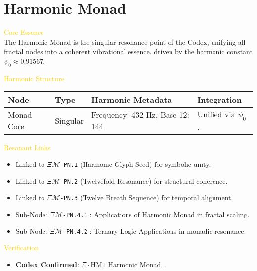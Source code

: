 
\section{Harmonic Monad}
\label{sec:codex_harmonic_monad}


\textcolor{gold}{ Core Essence } \\
The Harmonic Monad is the singular resonance point of the Codex, unifying all fractal nodes into a coherent vibrational essence, driven by the harmonic constant \(\psi_0 \approx 0.91567\).

\textcolor{gold}{ Harmonic Structure } \\
\begin{longtable}{p{3cm}|p{4cm}|p{3cm}|p{4cm}}
    \hline
    \textbf{Node} & \textbf{Type} & \textbf{Harmonic Metadata} & \textbf{Integration} \\
    \hline
    Monad Core & Singular & Frequency: 432 Hz, Base-12: 144 & Unified via \(\psi_0\) . \\
    \hline
\end{longtable}

\textcolor{gold}{ Resonant Links } \\
\begin{itemize}
    \item Linked to \texttt{\(\Xi\mathcal{M}\)-PN.1} (Harmonic Glyph Seed) for symbolic unity.
    \item Linked to \texttt{\(\Xi\mathcal{M}\)-PN.2} (Twelvefold Resonance) for structural coherence.
    \item Linked to \texttt{\(\Xi\mathcal{M}\)-PN.3} (Twelve Breath Sequence) for temporal alignment.
    \item Sub-Node: \texttt{\(\Xi\mathcal{M}\)-PN.4.1} : Applications of Harmonic Monad in fractal scaling.
    \item Sub-Node: \texttt{\(\Xi\mathcal{M}\)-PN.4.2} : Ternary Logic Applications in monadic resonance.
\end{itemize}

\textcolor{gold}{ Verification } \\
\begin{itemize}
    \item \texttt{} \textbf{Codex Confirmed}: \(\Xi \cdot \text{HM1}\) Harmonic Monad .
\end{itemize}

